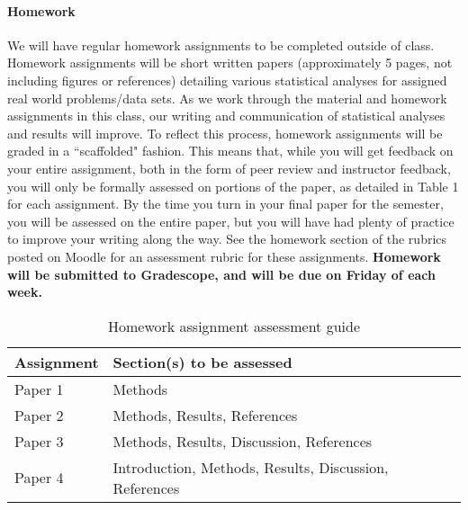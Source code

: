 \documentclass[11pt]{article}
\begin{document}
%

\paragraph{Homework}
We will have regular homework assignments to be completed outside of class. Homework assignments will be short written papers (approximately 5 pages, not including figures or references) detailing various statistical analyses for assigned real world problems/data sets. As we work through the material and homework assignments in this class, our writing and communication of statistical analyses and results will improve. To reflect this process, homework assignments will be graded in a ``scaffolded" fashion. This means that, while you will get feedback on your entire assignment, both in the form of peer review and instructor feedback, you will only be formally assessed on portions of the paper, as detailed in Table 1 for each assignment. By the time you turn in your final paper for the semester, you will be assessed on the entire paper, but you will have had plenty of practice to improve your writing along the way. See the homework section of the rubrics posted on Moodle for an assessment rubric for these assignments. \textbf{Homework will be submitted to Gradescope, and will be due on Friday of each week.}

\begin{table}[H]\centering
\begin{tabular}{l l}
\toprule
Assignment & Section(s) to be assessed\\
\hline
Paper 1 & Methods \\
Paper 2 & Methods, Results, References \\
Paper 3 & Methods, Results, Discussion, References \\
Paper 4 & Introduction, Methods, Results, Discussion, References \\
\bottomrule
\end{tabular}
\caption{Homework assignment assessment guide}
\end{table}
\end{document}
